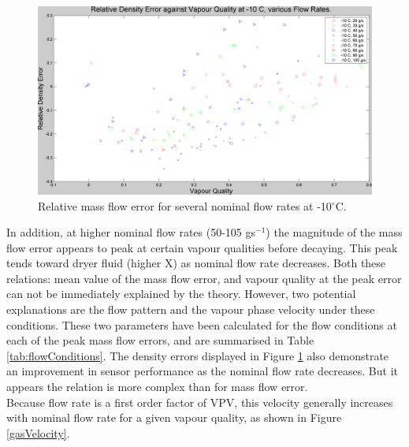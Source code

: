 \documentclass{report}
\begin{document}
\begin{figure}
\includegraphics[width=\textwidth]{plots/fig4}
\caption{Relative mass flow error for several nominal flow rates at -10$^\circ$C.}
\label{plot:4}
\end{figure}
\FloatBarrier
In addition, at higher nominal flow rates (50-105 gs$^{-1}$) the magnitude of the mass flow error appears to peak at certain vapour qualities before decaying. This peak tends toward dryer fluid (higher X) as nominal flow rate decreases. Both these relations: mean value of the mass flow error, and vapour quality at the peak error can not be immediately explained by the theory. However, two potential explanations are the flow pattern and the vapour phase velocity under these conditions. These two parameters have been calculated for the flow conditions at each of the peak mass flow errors, and are summarised in Table \ref{tab:flowConditions}. The density errors displayed in Figure \ref{plot:4} also demonstrate an improvement in sensor performance as the nominal flow rate decreases. But it appears the relation is more complex than for mass flow error. \\
Because flow rate is a first order factor of VPV, this velocity generally increases with nominal flow rate for a given vapour quality, as shown in Figure \ref{gasVelocity}.\\\\
\FloatBarrier
\end{document}
